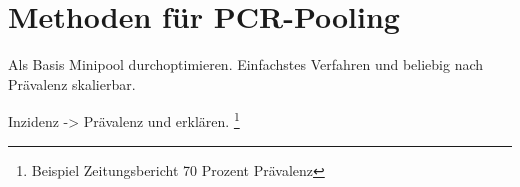 \cleardoublepage
\section{Methoden für PCR-Pooling}

Als Basis Minipool durchoptimieren. Einfachstes Verfahren und beliebig nach Prävalenz skalierbar.

Inzidenz -> Prävalenz und erklären. 
\footnote{Beispiel Zeitungsbericht 70 Prozent Prävalenz}

\cleardoublepage
\cleardoublepage
